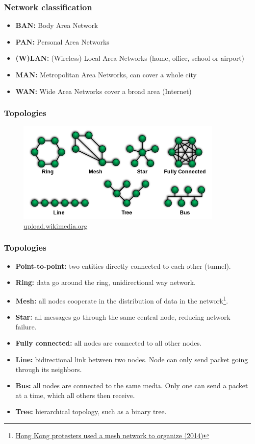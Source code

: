   \begin{frame}
    \frametitle{Network classification}
      \begin{itemize}
        \item \textbf{BAN:} Body Area Network
        \item \textbf{PAN:} Personal Area Networks
        \item \textbf{(W)LAN:} (Wireless) Local Area Networks (home, office, school or airport)
        \item \textbf{MAN:} Metropolitan Area Networks, can cover a whole city
        \item \textbf{WAN:} Wide Area Networks cover a broad area (Internet)
      \end{itemize}
  \end{frame}
  \begin{frame}
    \frametitle{Topologies}
    \begin{figure}[t]
      \centering
      \includegraphics[height=5cm]{./imgs/topologies.png}
      \caption{\color{blue}\href{https://upload.wikimedia.org/wikipedia/commons/thumb/9/97/NetworkTopologies.svg/640px-NetworkTopologies.svg.png}{upload.wikimedia.org}}
      \label{fig:topologies}
    \end{figure}
  \end{frame}
  \begin{frame}
    \frametitle{Topologies}
    \begin{itemize}
      \item \textbf{Point-to-point:} two entities directly connected to each other (tunnel).
      \item \textbf{Ring:} data go around the ring, unidirectional way network.
      \item \textbf{Mesh:} all nodes cooperate in the distribution of data in the network\footnote{\color{blue}\href{http://www.newscientist.com/article/dn26285-hong-kong-protesters-use-a-mesh-network-to-organise.html}{Hong Kong protesters used a mesh network to organize (2014)}}.
      \item \textbf{Star:} all messages go through the same central node, reducing network failure.
      \item \textbf{Fully connected:} all nodes are connected to all other nodes.
      \item \textbf{Line:} bidirectional link between two nodes. Node can only send packet going through its neighbors.
      \item \textbf{Bus:} all nodes are connected to the same media. Only one can send a packet at a time, which all others then receive.
      \item \textbf{Tree:} hierarchical topology, such as a binary tree.
    \end{itemize}
  \end{frame}
